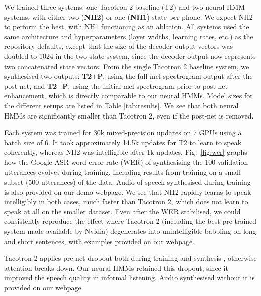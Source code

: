 \documentclass[british]{article}
\newcommand{\tc}{T2}
\newcommand{\tcp}{T2$+$P}
\newcommand{\tcnop}{T2$-$P}
\newcommand{\nhtwo}{NH2}
\newcommand{\nhone}{NH1}
\begin{document}
We trained three systems: one Tacotron 2 baseline (\tc{}) and two neural HMM systems, with either two (\textbf{\nhtwo{}}) or one (\textbf{\nhone{}}) state per phone.
We expect \nhtwo{} to perform the best, with \nhone{} functioning as an ablation.
All systems used the same architecture and hyperparameters (layer widths, learning rates, etc.) as the
repository defaults, except that the size of the decoder output vectors was doubled to 1024 in the two-state system, since the decoder output now represents two concatenated state vectors.
From the single Tacotron 2 baseline system, we synthesised two outputs:
\textbf{\tcp{}}, using the full mel-spectrogram output after the post-net, and \textbf{\tcnop{}}, using the initial mel-spectrogram prior to post-net enhancement, which is directly comparable to our neural HMMs.
Model sizes for the different setups are listed in Table \ref{tab:results}.
We see that both neural HMMs are significantly smaller than Tacotron 2, even if the post-net is removed.

Each system was trained for 30k mixed-precision updates on 7 GPUs using a batch size of 6.
It took approximately 14.5k updates for \tc{} to learn to
speak coherently, whereas \nhtwo{}
was intelligible after 1k updates.
Fig.\ \ref{fig:wer} graphs how the Google ASR word error rate (WER) of synthesising the 100 validation utterances evolves during training, including results from training on a small subset (500 utterances) of the data.
Audio of speech synthesised during training is also provided on our demo webpage.
We see that \nhtwo{} rapidly learns to speak intelligibly in both cases, much faster than Tacotron 2, which does not learn to speak at all on the smaller dataset.
Even after the WER stabilised, we could consistently reproduce the effect where Tacotron 2 (including the best pre-trained system made available by Nvidia) degenerates into unintelligible babbling on long and short sentences, with examples provided on our webpage.


Tacotron 2 applies pre-net dropout both during training and synthesis \cite{shen2018natural}, otherwise attention breaks down.
Our neural HMMs retained this dropout, since it improved the speech quality in informal listening.
Audio synthesised without it is provided on our webpage.
\end{document}
